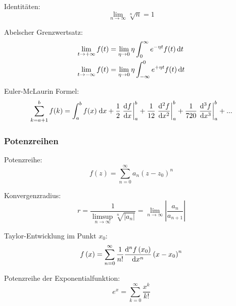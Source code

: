 \documentclass[11pt]{article}
\numberwithin{equation}{section}
\begin{document}
				\noindent
				Identitäten:
				\begin{equation}
					\lim_{n\rightarrow\infty} \sqrt[n]{n} = 1
				\end{equation}

				\noindent
				Abelscher Grenzwertsatz:
				\begin{equation}
					\begin{aligned}
						\lim_{t\rightarrow+\infty} f(t) &= \lim_{\eta\rightarrow 0} \eta \int_0^\infty e^{-\eta t} f(t) \,\mathrm{d} t \\
						\lim_{t\rightarrow-\infty} f(t) &= \lim_{\eta\rightarrow 0} \eta \int_{-\infty}^{0} e^{+\eta t} f(t) \,\mathrm{d} t \\
					\end{aligned}
				\end{equation}

				\noindent
				Euler-McLaurin Formel:
				\begin{equation}
					\sum_{k=a+1}^{b} f(k) = \int_{a}^{b}f(x) \;\mathrm{d} x
					+ \frac{1}{2} \left.\frac{\mathrm{d} f}{\mathrm{d} x} \right|_{a}^{b}
					+ \frac{1}{12}\left.\frac{\mathrm{d}^2 f}{\mathrm{d} x^2} \right|_{a}^{b}
					+ \frac{1}{720} \left.\frac{\mathrm{d}^3 f}{\mathrm{d} x^3} \right|_{a}^{b}
					+ ...
				\end{equation}

			\subsubsection{Potenzreihen}
				\noindent
				Potenzreihe:
				\begin{equation}
					f(z) = \sum_{n=0}^{\infty} a_n (z-z_0)^n
				\end{equation}

				\noindent
				Konvergenzradius:
				\begin{equation}
					r = \frac{1}{\limsup\limits_{n\rightarrow\infty} \sqrt[n]{\left|a_n\right|}} = \lim_{n\rightarrow\infty}\left|\frac{a_n}{a_{n+1}}\right|
				\end{equation}

				\noindent
				Taylor-Entwicklung im Punkt $x_0$:
				\begin{equation}
					f\left(x\right)=\sum_{n=0}^{\infty}\frac{1}{n!}\frac{\mathrm{d}^{n}f\left(x_0\right)}{\mathrm{d} x^{n}}\left(x-x_0\right)^{n}
				\end{equation}

				\noindent
				Potenzreihe der Exponentialfunktion:
				\begin{equation}
					e^x=\sum_{k=0}^{\infty}{\frac{x^k}{k!}}
				\end{equation}
\end{document}
